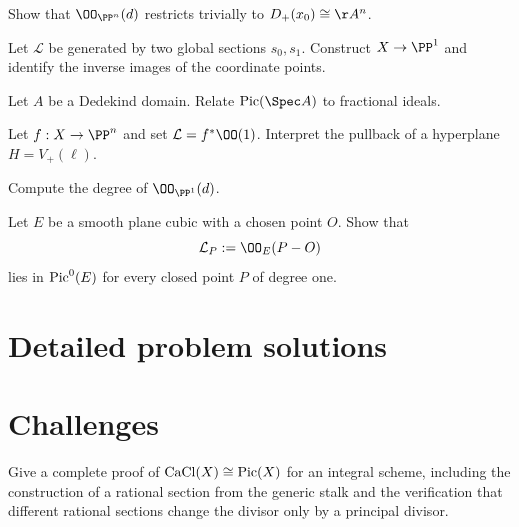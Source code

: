 \begin{problem}\label{prob:vi42-07}
Show that \(\OO_{\PP^n}(d)\) restricts trivially to \(D_+(x_0)\cong\AA^n\).
\end{problem}

\begin{problem}\label{prob:vi42-08}
Let \(\mathcal L\) be generated by two global sections \(s_0,s_1\).  Construct \(X\to\PP^1\) and identify the inverse images of the coordinate points.
\end{problem}

\begin{problem}\label{prob:vi42-09}
Let \(A\) be a Dedekind domain.  Relate \(\Pic(\Spec A)\) to fractional ideals.
\end{problem}

\begin{problem}\label{prob:vi42-10}
Let \(f:X\to\PP^n\) and set \(\mathcal L=f^*\OO(1)\).  Interpret the pullback of a hyperplane \(H=V_+(\ell)\).
\end{problem}

\begin{problem}[Degree of \(\OO_{\PP^1}(d)\)]\label{prob:vi42-11}
Compute the degree of \(\OO_{\PP^1}(d)\).
\end{problem}

\begin{problem}\label{prob:vi42-12}
Let \(E\) be a smooth plane cubic with a chosen point \(O\).  Show that
\[
  \mathcal L_P:=\OO_E(P-O)
\]
lies in \(\operatorname{Pic}^0(E)\) for every closed point \(P\) of degree one.
\end{problem}

\ifdefined\FullProblemDossiers
\section{Detailed problem solutions}

\fi

\section{Challenges}

\begin{problem}\label{chal:vi42-01}
Give a complete proof of \(\operatorname{CaCl}(X)\cong\operatorname{Pic}(X)\) for an integral scheme, including the construction of a rational section from the generic stalk and the verification that different rational sections change the divisor only by a principal divisor.
\end{problem}

